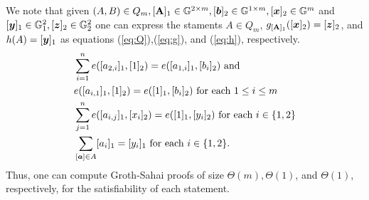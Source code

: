 We note that given $(A,B)\in Q_m,[\mathbf{{A}}]_1\in\mathbb{G}^{2\times m},[{\boldsymbol{b}}]_2\in\mathbb{G}^{1\times m},[{\boldsymbol{x}}]_2\in\mathbb{G}^m$ and $[{\boldsymbol{y}}]_1\in\mathbb{G}_1^2,[{\boldsymbol{z}}]_2\in\mathbb{G}_2^2$ one can express the staments $A\in Q_m$, $g_{[\mathbf{{A}}]_1}([{\boldsymbol{x}}]_2)=[{\boldsymbol{z}}]_2$, and $h(A)=[{\boldsymbol{y}}]_1$ as equations (\ref{eq:Q}),(\ref{eq:g}), and (\ref{eq:h}), respectively.
 \begin{align}
&\sum_{i=1}^n e([a_{2,i}]_1,[1]_2)=e([a_{1,i}]_1,[b_{i}]_2) \text{ and }\nonumber\\
&e([a_{i,1}]_1,[1]_2)=e([1]_1,[b_i]_2) \text{ for each } 1\leq i\leq m \label{eq:Q}\\
&\sum_{j=1}^n e([a_{i,j}]_1,[x_i]_2) = e([1]_1,[y_i]_2) \text{ for each } i\in\{1,2\} \label{eq:g}\\
&\sum_{[{\boldsymbol{a}}]\in A} [a_i]_1 = [y_i]_1 \text{ for each } i\in\{1,2\}.\label{eq:h}
\end{align}
Thus, one can compute Groth-Sahai proofs of size $\Theta(m),\Theta(1)$, and $\Theta(1)$, respectively, for the satisfiability of each statement.
%
